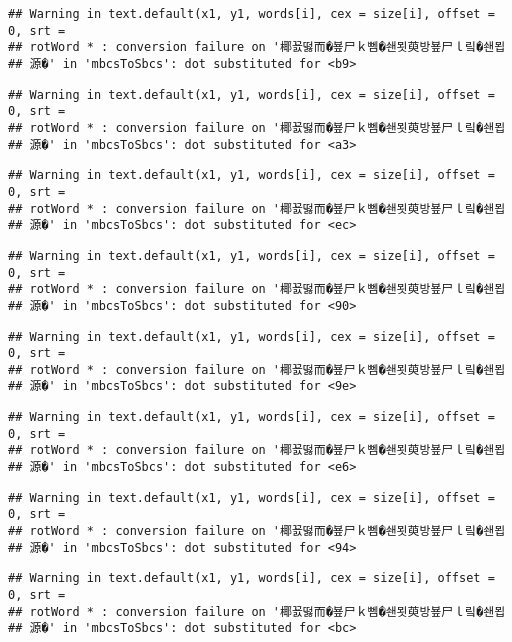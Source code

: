 \documentclass[]{article}
\begin{document}
\begin{verbatim}
## Warning in text.default(x1, y1, words[i], cex = size[i], offset = 0, srt =
## rotWord * : conversion failure on '椰꾨떯而�뵾尸ｋ뻼�쇈묏萸방뵾尸ｌ맄�쇈묍
## 源�' in 'mbcsToSbcs': dot substituted for <b9>
\end{verbatim}

\begin{verbatim}
## Warning in text.default(x1, y1, words[i], cex = size[i], offset = 0, srt =
## rotWord * : conversion failure on '椰꾨떯而�뵾尸ｋ뻼�쇈묏萸방뵾尸ｌ맄�쇈묍
## 源�' in 'mbcsToSbcs': dot substituted for <a3>
\end{verbatim}

\begin{verbatim}
## Warning in text.default(x1, y1, words[i], cex = size[i], offset = 0, srt =
## rotWord * : conversion failure on '椰꾨떯而�뵾尸ｋ뻼�쇈묏萸방뵾尸ｌ맄�쇈묍
## 源�' in 'mbcsToSbcs': dot substituted for <ec>
\end{verbatim}

\begin{verbatim}
## Warning in text.default(x1, y1, words[i], cex = size[i], offset = 0, srt =
## rotWord * : conversion failure on '椰꾨떯而�뵾尸ｋ뻼�쇈묏萸방뵾尸ｌ맄�쇈묍
## 源�' in 'mbcsToSbcs': dot substituted for <90>
\end{verbatim}

\begin{verbatim}
## Warning in text.default(x1, y1, words[i], cex = size[i], offset = 0, srt =
## rotWord * : conversion failure on '椰꾨떯而�뵾尸ｋ뻼�쇈묏萸방뵾尸ｌ맄�쇈묍
## 源�' in 'mbcsToSbcs': dot substituted for <9e>
\end{verbatim}

\begin{verbatim}
## Warning in text.default(x1, y1, words[i], cex = size[i], offset = 0, srt =
## rotWord * : conversion failure on '椰꾨떯而�뵾尸ｋ뻼�쇈묏萸방뵾尸ｌ맄�쇈묍
## 源�' in 'mbcsToSbcs': dot substituted for <e6>
\end{verbatim}

\begin{verbatim}
## Warning in text.default(x1, y1, words[i], cex = size[i], offset = 0, srt =
## rotWord * : conversion failure on '椰꾨떯而�뵾尸ｋ뻼�쇈묏萸방뵾尸ｌ맄�쇈묍
## 源�' in 'mbcsToSbcs': dot substituted for <94>
\end{verbatim}

\begin{verbatim}
## Warning in text.default(x1, y1, words[i], cex = size[i], offset = 0, srt =
## rotWord * : conversion failure on '椰꾨떯而�뵾尸ｋ뻼�쇈묏萸방뵾尸ｌ맄�쇈묍
## 源�' in 'mbcsToSbcs': dot substituted for <bc>
\end{verbatim}
\end{document}
